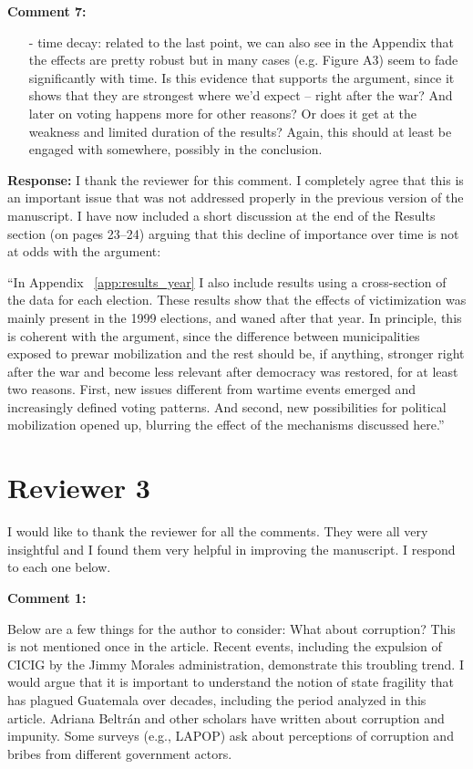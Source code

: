 \documentclass[12pt, a4paper, notitlepage]{article}
\begin{document}
\vspace{15pt}
\noindent\textbf{Comment 7:}
\begin{displayquote}
\begin{itemize}
\item[-] time decay: related to the last point, we can also see in the Appendix that the effects are pretty robust but in many cases (e.g. Figure A3) seem to fade significantly with time. Is this evidence that supports the argument, since it shows that they are strongest where we’d expect – right after the war? And later on voting happens more for other reasons? Or does it get at the weakness and limited duration of the results? Again, this should at least be engaged with somewhere, possibly in the conclusion.
\end{itemize}
\end{displayquote}

\noindent\textbf{Response:} I thank the reviewer for this comment. I completely agree that this is an important issue that was not addressed properly in the previous version of the manuscript. I have now included a short discussion at the end of the Results section (on pages 23--24) arguing that this decline of importance over time is not at odds with the argument:

``In Appendix ~\ref{app:results_year} I also include results using a cross-section of the data for each election.
These results show that the effects of victimization was mainly present in the 1999 elections, and waned after that year.
In principle, this is coherent with the argument, since the difference between municipalities exposed to prewar mobilization and the rest should be, if anything, stronger right after the war and become less relevant after democracy was restored, for at least two reasons.
First, new issues different from wartime events emerged and increasingly defined voting patterns.
And second, new possibilities for political mobilization opened up, blurring the effect of the mechanisms discussed here.''

\newpage
\section*{Reviewer 3}

I would like to thank the reviewer for all the comments. They were all very insightful and I found them very helpful in improving the manuscript. I respond to each one below.

\vspace{15pt}
\noindent\textbf{Comment 1:}
\begin{displayquote}
Below are a few things for the author to consider:
What about corruption? This is not mentioned once in the article. Recent events, including the expulsion of CICIG by the Jimmy Morales administration, demonstrate this troubling trend. I would argue that it is important to understand the notion of state fragility that has plagued Guatemala over decades, including the period analyzed in this article. Adriana Beltrán and other scholars have written about corruption and impunity. Some surveys (e.g., LAPOP) ask about perceptions of corruption and bribes from different government actors.
\end{displayquote}
\end{document}
